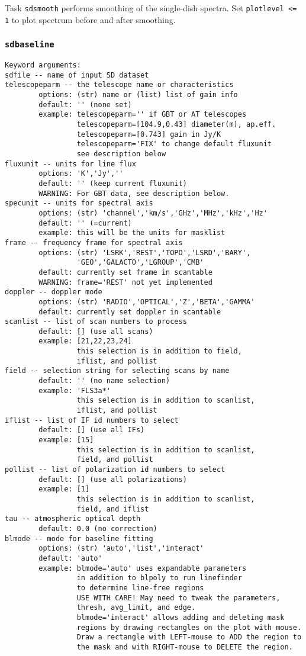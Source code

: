     Task {\tt sdsmooth} performs smoothing of the single-dish spectra.
    Set {\tt plotlevel <= 1} to plot spectrum before and after smoothing.

    
\subsubsection{{\tt sdbaseline}}
\label{section:sd.sdtasks.tasks.sdbaseline}

\begin{verbatim}
Keyword arguments:
sdfile -- name of input SD dataset
telescopeparm -- the telescope name or characteristics
        options: (str) name or (list) list of gain info
        default: '' (none set)
        example: telescopeparm='' if GBT or AT telescopes
                 telescopeparm=[104.9,0.43] diameter(m), ap.eff.
                 telescopeparm=[0.743] gain in Jy/K
                 telescopeparm='FIX' to change default fluxunit
                 see description below
fluxunit -- units for line flux
        options: 'K','Jy',''
        default: '' (keep current fluxunit)
        WARNING: For GBT data, see description below.
specunit -- units for spectral axis
        options: (str) 'channel','km/s','GHz','MHz','kHz','Hz'
        default: '' (=current)
        example: this will be the units for masklist
frame -- frequency frame for spectral axis
        options: (str) 'LSRK','REST','TOPO','LSRD','BARY',
                 'GEO','GALACTO','LGROUP','CMB'
        default: currently set frame in scantable
        WARNING: frame='REST' not yet implemented
doppler -- doppler mode
        options: (str) 'RADIO','OPTICAL','Z','BETA','GAMMA'
        default: currently set doppler in scantable
scanlist -- list of scan numbers to process
        default: [] (use all scans)
        example: [21,22,23,24]
                 this selection is in addition to field,
                 iflist, and pollist
field -- selection string for selecting scans by name
        default: '' (no name selection)
        example: 'FLS3a*'
                 this selection is in addition to scanlist,
                 iflist, and pollist
iflist -- list of IF id numbers to select
        default: [] (use all IFs)
        example: [15]
                 this selection is in addition to scanlist,
                 field, and pollist
pollist -- list of polarization id numbers to select
        default: [] (use all polarizations)
        example: [1]
                 this selection is in addition to scanlist,
                 field, and iflist
tau -- atmospheric optical depth
        default: 0.0 (no correction)
blmode -- mode for baseline fitting
        options: (str) 'auto','list','interact'
        default: 'auto'
        example: blmode='auto' uses expandable parameters
                 in addition to blpoly to run linefinder
                 to determine line-free regions
                 USE WITH CARE! May need to tweak the parameters,
                 thresh, avg_limit, and edge.
                 blmode='interact' allows adding and deleting mask
                 regions by drawing rectangles on the plot with mouse.
                 Draw a rectangle with LEFT-mouse to ADD the region to
                 the mask and with RIGHT-mouse to DELETE the region.


\end{verbatim}
